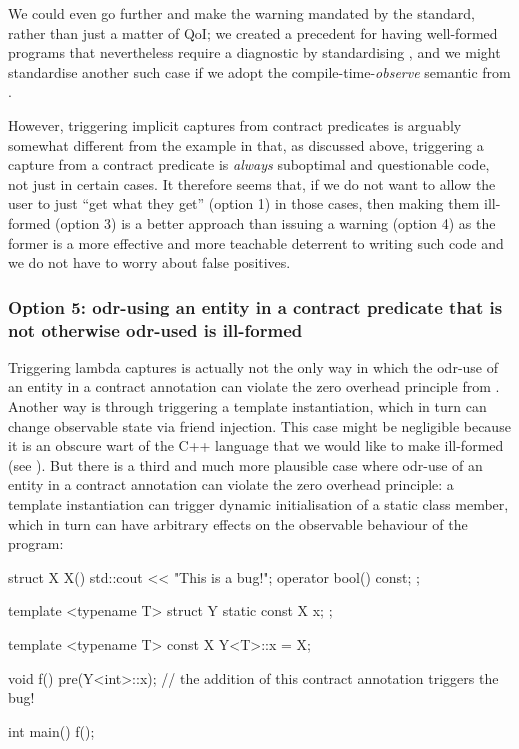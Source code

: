 We could even go further and make the warning mandated by the standard, rather than just a matter of QoI; we created a precedent for having well-formed programs that nevertheless require a diagnostic by standardising , and we might standardise another such case if we adopt the compile-time-\emph{observe} semantic from \cite{P2894R1}.

However, triggering implicit captures from contract predicates is arguably somewhat different from the  example in that, as discussed above, triggering a capture from a contract predicate is \emph{always} suboptimal and questionable code, not just in certain cases. It therefore seems that, if we do not want to allow the user to just ``get what they get'' (option 1) in those cases, then making them ill-formed (option 3) is a better approach than issuing a warning (option 4) as the former is a more effective and more teachable deterrent to writing such code and we do not have to worry about false positives.

\subsubsection{Option 5: odr-using an entity in a contract predicate that is not otherwise odr-used is ill-formed}

Triggering lambda captures is actually not the only way in which the odr-use of an entity in a contract annotation can violate the zero overhead principle from \cite{P2932R2}. Another way is through triggering a template instantiation, which in turn can change observable state via friend injection. This case might be negligible because it is an obscure wart of the C++ language that we would like to make ill-formed (see \cite{CWG2118}). But there is a third and much more plausible case where odr-use of an entity in a contract annotation can violate the zero overhead principle: a template instantiation can trigger dynamic initialisation of a static class member, which in turn can have arbitrary effects on the observable behaviour of the program:

\begin{codeblock}
struct X {
  X() { std::cout << "This is a bug!\n"; }
  operator bool() const;
};

template <typename T>
struct Y {
  static const X x;
};

template <typename T>
const X Y<T>::x = X{};

void f()
  pre(Y<int>::x);  // the addition of this contract annotation triggers the bug!

int main() {
  f(); 
}
\end{codeblock}

